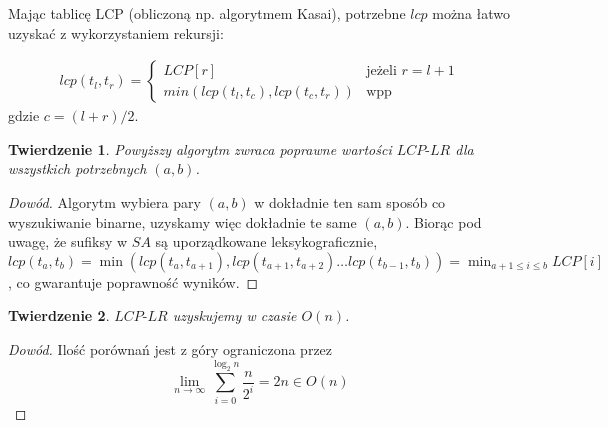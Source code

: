 \documentclass[12pt]{article}
\newtheorem*{theorem}{Twierdzenie}
\begin{document}
Mając tablicę LCP (obliczoną np. algorytmem Kasai), potrzebne $lcp$ można łatwo uzyskać z wykorzystaniem rekursji:

\begin{align*}
   lcp(t_l, t_r) = 
   \begin{cases}
        LCP[r] & \text{jeżeli } r = l + 1 \\
        min(lcp(t_l, t_c), lcp(t_c, t_r)) & \text{wpp}
   \end{cases}
\end{align*} 
gdzie $c = (l + r) / 2$.

\begin{theorem}
Powyższy algorytm zwraca poprawne wartości $LCP\textrm{-}LR$ dla wszystkich potrzebnych $(a, b)$.
\end{theorem}

\begin{proof}[Dowód]
Algorytm wybiera pary $(a, b)$ w dokładnie ten sam sposób co wyszukiwanie binarne, uzyskamy więc dokładnie te same $(a, b)$. Biorąc pod uwagę, że sufiksy w $SA$ są uporządkowane leksykograficznie, $lcp(t_a, t_b) = \min(lcp(t_a, t_{a + 1}), \allowbreak lcp(t_{a + 1}, t_{a + 2}) \ldots \allowbreak lcp(t_{b-1}, t_{b}))= \min_{a + 1 \leq i \leq b} LCP[i] $, co gwarantuje poprawność wyników.
\end{proof}

\begin{theorem}
$LCP\textrm{-}LR$ uzyskujemy w czasie $O(n)$.
\end{theorem}

\begin{proof}[Dowód]
Ilość porównań jest z góry ograniczona przez $$\lim_{n \to \infty} \sum_{i=0}^{\log_2{n}} \frac{n}{2^i} = 2n \in O(n)$$
\end{proof}
\end{document}
